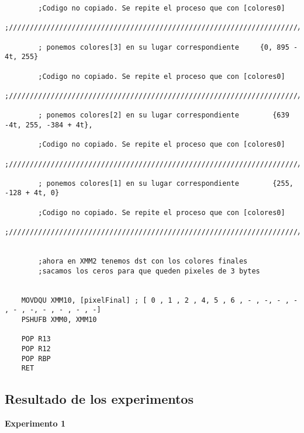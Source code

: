 \begin{codesnippet}
\begin{verbatim}
        ;Codigo no copiado. Se repite el proceso que con [colores0]
	;///////////////////////////////////////////////////////////////////////////////////////////////////

        ; ponemos colores[3] en su lugar correspondiente     {0, 895 - 4t, 255}

        ;Codigo no copiado. Se repite el proceso que con [colores0]
	;///////////////////////////////////////////////////////////////////////////////////////////////////

        ; ponemos colores[2] en su lugar correspondiente		{639 -4t, 255, -384 + 4t},	

        ;Codigo no copiado. Se repite el proceso que con [colores0]
    ;///////////////////////////////////////////////////////////////////////////////////////////////////

        ; ponemos colores[1] en su lugar correspondiente		{255, -128 + 4t, 0}

        ;Codigo no copiado. Se repite el proceso que con [colores0]
    ;///////////////////////////////////////////////////////////////////////////////////////////////////	
    
    
        ;ahora en XMM2 tenemos dst con los colores finales
        ;sacamos los ceros para que queden pixeles de 3 bytes
        
        
    MOVDQU XMM10, [pixelFinal] ; [ 0 , 1 , 2 , 4, 5 , 6 , - , -, - , - , - , -, - , - , - , -]
    PSHUFB XMM0, XMM10
    
    POP R13
    POP R12
    POP RBP
    RET
\end{verbatim}
\end{codesnippet}

\subsection{Resultado de los experimentos}
\vspace*{0.3cm} \noindent
\textbf{Experimento 1}




%
%



